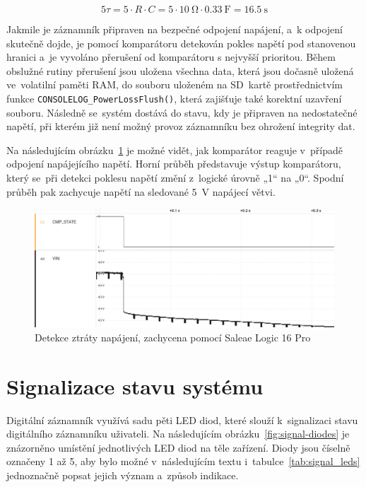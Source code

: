 \[
    5\tau = 5 \cdot R \cdot C = 5 \cdot \SI{10}{\ohm} \cdot \SI{0.33}{\farad} = \SI{16.5}{\second}
\]

Jakmile je záznamník připraven na bezpečné odpojení napájení, a~k odpojení skutečně dojde, je pomocí komparátoru detekován pokles napětí pod stanovenou hranici a~je vyvoláno přerušení od komparátoru s nejvyšší prioritou. Během obslužné rutiny přerušení jsou uložena všechna data, která jsou dočasně uložená ve~volatilní paměti RAM, do souboru uloženém na SD~kartě prostřednictvím funkce \texttt{CONSOLELOG\_PowerLossFlush()}, která zajišťuje také korektní uzavření souboru. Následně se~systém dostává do stavu, kdy je připraven na nedostatečné napětí, při kterém již není možný provoz záznamníku bez ohrožení integrity dat.

Na následujícím obrázku~\ref{fig:pwrloss-detection-saleae} je možné vidět, jak komparátor reaguje v~případě odpojení napájejícího napětí.  Horní průběh představuje výstup komparátoru, který se~při detekci poklesu napětí změní z~logické úrovně „1“ na „0“. Spodní průběh pak zachycuje napětí na sledované \SI{5}{\volt} napájecí větvi.

\begin{figure}[h]
    \centering
    \includegraphics[width=1.00\textwidth]{obrazky-figures/saleae-power-loss-det.png}
    
    \caption{Detekce ztráty napájení, zachycena pomocí Saleae Logic 16 Pro}
    \label{fig:pwrloss-detection-saleae}
\end{figure}

\newpage

\section{Signalizace stavu systému}
\label{signalizace_stavu_systemu}
Digitální záznamník využívá sadu pěti LED diod, které slouží k~signalizaci stavu digitálního záznamníku uživateli. Na následujícím obrázku~\ref{fig:signal-diodes} je znázorněno umístění jednotlivých LED diod na těle zařízení. Diody jsou číselně označeny 1 až 5, aby bylo možné v~následujícím textu i~tabulce~\ref{tab:signal_leds} jednoznačně popsat jejich význam a~způsob indikace.

